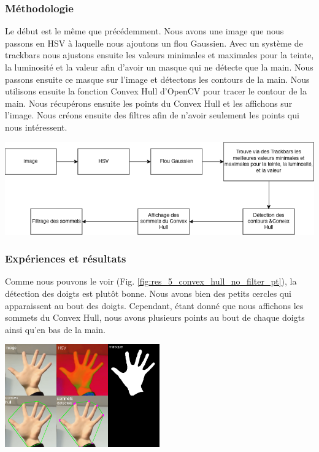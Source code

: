 \documentclass[11pt]{article}
\begin{document}
\subsubsection{Méthodologie}
Le début est le même que précédemment. Nous avons une image que nous passons en HSV à laquelle nous ajoutons un flou Gaussien. Avec un système de trackbars nous ajustons ensuite les valeurs minimales et maximales pour la teinte, la luminosité et la valeur afin d'avoir un masque qui ne détecte que la main. Nous passons ensuite ce masque sur l'image et détectons les contours de la main. Nous utilisons ensuite la fonction Convex Hull d'OpenCV pour tracer le contour de la main. Nous récupérons ensuite les points du Convex Hull et les affichons sur l'image. Nous créons ensuite des filtres afin de n'avoir seulement les points qui nous intéressent.
\bigbreak

\begin{center}
    \includegraphics[width=\textwidth]{images/pipeline_detect_fingers_avec_convex_hull.png}
    \label{fig:pipeline_detect_fingers_avec_convex_hull}
\end{center}

\subsubsection{Expériences et résultats}

Comme nous pouvons le voir (Fig. \ref{fig:res_5_convex_hull_no_filter_pt}), la détection des doigts est plutôt bonne. Nous avons bien des petits cercles qui apparaissent au bout des doigts. Cependant, étant donné que nous affichons les sommets du Convex Hull, nous avons plusieurs points au bout de chaque doigts ainsi qu'en bas de la main.
\begin{center}
    \includegraphics[width=0.5\textwidth]{images/res_5_convex_hull_no_filter_pt.png}
    \label{fig:res_5_convex_hull_no_filter_pt}
\end{center}
\bigbreak
\end{document}
